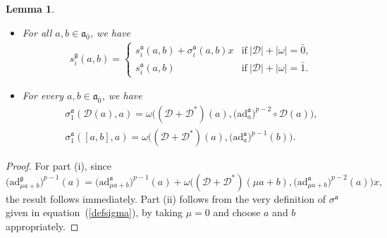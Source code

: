 \documentclass[pdftex]{sigma}
\numberwithin{equation}{section}
\newtheorem{Lemma}[Theorem]{Lemma}
\begin{document}
\begin{Lemma}%
\qquad
\begin{itemize}\itemsep=0pt
\item[$(i)$] For all $a,b\in \mathfrak{a}_{\bar 0}$, we have
\begin{gather*}%
s_i^\mathfrak{g}(a,b)=
 \begin{cases}
s_i^\mathfrak{a}(a,b)+ \sigma_i^{\mathfrak{a}}(a,b)x & \text{if} \ |{\mathscr D}|+|\omega|=
{\bar 0}, \\
s_i^\mathfrak{a}(a,b) & \text{if} \ |{\mathscr D}|+|\omega|={\bar 1}.
\end{cases}
\end{gather*}
\item[$(ii)$] For every $a,b\in \mathfrak{a}_{\bar 0}$, we have
\begin{gather*}
\sigma_1^\mathfrak{a}({\mathscr D}(a),a) = \omega \bigl(({\mathscr D}+ {\mathscr D}^*)(a), \bigl(\mathrm{ad}_a^\mathfrak{a}\bigr)^{p-2}\circ {\mathscr D}(a)\bigr),\\
 \sigma_1^\mathfrak{a}([a,b], a) = \omega \bigl(({\mathscr D}+ {\mathscr D}^*)(a), \bigl(\mathrm{ad}_a^\mathfrak{a}\bigr)^{p-1}(b)\bigr).
\end{gather*}
\end{itemize}
\end{Lemma}
\begin{proof}
For part (i), since
\[
\big(\mathrm{ad}_{\mu a+b}^\mathfrak{g}\big)^{p-1}(a)=\big(\mathrm{ad}_{\mu a+b}^\mathfrak{a}\big)^{p-1}(a)+\omega\bigl(({\mathscr D}+{\mathscr D}^*)(\mu a+b),\big(\mathrm{ad}_{\mu a+b}^\mathfrak{a}\big)^{p-2}(a) \bigr)x,
\]
the result follows immediately. Part (ii) follows from the very definition of $\sigma^\mathfrak{a}$ given in equation~(\ref{defsigma}), by taking $\mu=0$ and choose $a$ and $b$ appropriately.
\end{proof}
\end{document}
